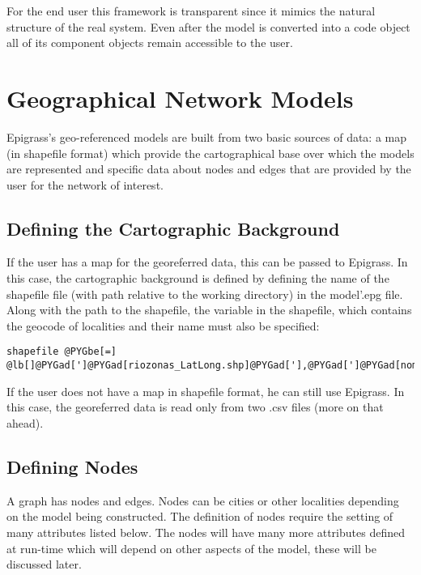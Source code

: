 \documentclass[a4paper,10pt]{manual}
\begin{document}
For the end user this framework is transparent since it mimics the natural structure of the real system. Even after the model is converted into a code object all of its component objects remain accessible to the user.


\section{Geographical Network Models}
Epigrass's geo-referenced models are built from two basic sources of data: a map (in shapefile format) which provide the cartographical base over which the models are represented and specific data about nodes and edges that are provided by the user for the network of interest.


\subsection{Defining the Cartographic Background}

If the user has a map for the georeferred data, this can be passed to Epigrass. In this case, the cartographic background is defined by defining the name of the shapefile file (with path relative to the working directory) in the model'.epg file. Along with the path to the shapefile,  the variable in the shapefile, which contains the geocode of localities and their name must also be specified:

\begin{Verbatim}[commandchars=@\[\]]
shapefile @PYGbe[=]  @lb[]@PYGad[']@PYGad[riozonas_LatLong.shp]@PYGad['],@PYGad[']@PYGad[nome_zonas]@PYGad['],@PYGad[']@PYGad[zona_trafe]@PYGad[']@rb[]
\end{Verbatim}

If the user does not have a map in shapefile format, he can still use Epigrass. In this case, the georeferred data is read only from two .csv files (more on that ahead).


\subsection{Defining Nodes}

A graph has nodes and edges. Nodes can be cities or other localities depending on the model being constructed. The definition of nodes require the setting of many attributes listed below. The nodes will have many more attributes defined at run-time which will depend on other aspects of the model, these will be discussed later.
\end{document}
